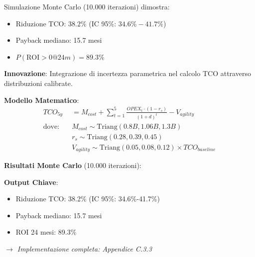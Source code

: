 \begin{tcolorbox}[colback=yellow!10!white,colframe=orange!75!black,title=Risultato Chiave]
Simulazione Monte Carlo (10.000 iterazioni) dimostra:
\begin{itemize}
\item Riduzione TCO: $38.2\%$ (IC 95\%: $34.6\%-41.7\%$)
\item Payback mediano: 15.7 mesi
\item $P(\text{ROI}>0 @ 24m) = 89.3\%$
\end{itemize}
\end{tcolorbox}
\begin{tcolorbox}[
    colback=orange!5!white,
    colframe=orange!65!black,
    title={\textbf{Innovation Box 3.1:} Modello TCO Stocastico per Cloud Migration},
    fonttitle=\bfseries,
    boxrule=1.5pt,
    arc=2mm,
    breakable
]
\textbf{Innovazione}: Integrazione di incertezza parametrica nel calcolo TCO attraverso distribuzioni calibrate.

\vspace{0.3cm}
\textbf{Modello Matematico}:
\begin{align*}
TCO_{5y} &= M_{cost} + \sum_{t=1}^{5} \frac{OPEX_t \cdot (1-r_s)}{(1+d)^t} - V_{agility} \\
\text{dove:} \quad & M_{cost} \sim \text{Triang}(0.8B, 1.06B, 1.3B) \\
& r_s \sim \text{Triang}(0.28, 0.39, 0.45) \\
& V_{agility} \sim \text{Triang}(0.05, 0.08, 0.12) \times TCO_{baseline}
\end{align*}

\vspace{0.3cm}
\textbf{Risultati Monte Carlo} (10.000 iterazioni):
\begin{center}
\end{center}

\textbf{Output Chiave}:
\begin{itemize}%
    \item Riduzione TCO: 38.2\% (IC 95\%: 34.6\%-41.7\%)
    \item Payback mediano: 15.7 mesi
    \item ROI 24 mesi: 89.3\%
\end{itemize}

\textit{$\rightarrow$ Implementazione completa: Appendice C.3.3}
\end{tcolorbox}


